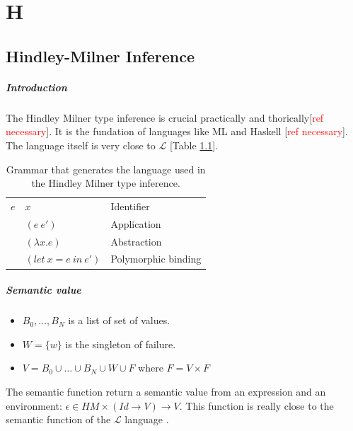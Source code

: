 \documentclass[a4paper]{report}
\newcommand{\comm}[1]{[\textcolor{red}{#1}]}
\newcommand{\lang}[0]{\mathcal{L}}
\newcommand{\reftab}[1]{[Table \ref{#1}]}
\begin{document}
\chapter{H}

\section{Hindley-Milner Inference}

\paragraph{Introduction} The Hindley Milner type inference is crucial practically and thorically\comm{ref necessary}. It is the fundation of languages like ML and Haskell \comm{ref necessary}. The language itself is very close to $\lang$ \reftab{hml}.

\begin{table}
\centering
\begin{tabular}{|r|l|l|}
\hline
$e$ & $x$ & Identifier\\
& $(e\ e')$ & Application\\
& $(\lambda x . e)$ & Abstraction\\
& $(let\ x=e\ in\ e')$ & Polymorphic binding\\
\hline
\end{tabular}
\caption{Grammar that generates the language used in the Hindley Milner type inference.}
\label{hml}
\end{table}

\paragraph{Semantic value} 
\begin{itemize}
\item $B_0, \ldots,B_N$ is a list of set of values.
\item $W=\{w\}$ is the singleton of failure.
\item $V=B_0\cup\ldots\cup B_N\cup W\cup F$ where $F=V\times F$
\end{itemize}
The semantic function return a semantic value from an expression and an environment: $\epsilon\in HM\times (Id\to V)\to V$. This function is really close to the semantic function of the $\lang$ language \cite{hm1}.
\end{document}
